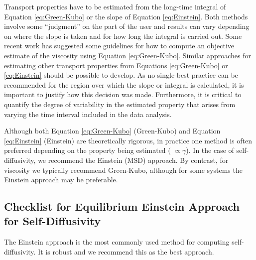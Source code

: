 \documentclass[9pt]{livecoms}
\begin{document}
Transport properties have to be estimated from the long-time integral of Equation \ref{eq:Green-Kubo} or the slope of Equation \ref{eq:Einstein}. Both methods involve some “judgment” on the part of the user and results can vary depending on where the slope is taken and for how long the integral is carried out. Some recent work has suggested some guidelines for how to compute an objective estimate of the viscosity using Equation \ref{eq:Green-Kubo}. Similar approaches for estimating other transport properties from Equations \ref{eq:Green-Kubo} or \ref{eq:Einstein} should be possible to develop. As no single best practice can be recommended for the region over which the slope or integral is calculated, it is important to justify how this decision was made. Furthermore, it is critical to quantify the degree of variability in the estimated property that arises from varying the time interval included in the data analysis.

Although both Equation \ref{eq:Green-Kubo} (Green-Kubo) and Equation \ref{eq:Einstein} (Einstein) are theoretically rigorous, in practice one method is often preferred depending on the property being estimated ( $\propto \gamma$). In the case of self-diffusivity, we recommend the Einstein (MSD) approach. By contrast, for viscosity we typically recommend Green-Kubo, although for some systems the Einstein approach may be preferable. 

\subsection{Checklist for Equilibrium Einstein Approach for Self-Diffusivity}


The Einstein approach is the most commonly used method for computing self-diffusivity. It is robust and we recommend this as the best approach.
\end{document}
